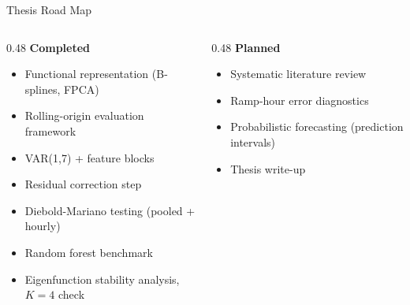 \documentclass[10pt,aspectratio=169]{beamer}
\begin{document}
\begin{frame}{Thesis Road Map}
  \begin{columns}
    \begin{column}{0.48\textwidth}
      \textbf{\textcolor{accentblue}{Completed}}
      \vspace{0.3em}
      \begin{itemize}
        \item[$\checkmark$] Functional representation (B-splines, FPCA)
        \item[$\checkmark$] Rolling-origin evaluation framework
        \item[$\checkmark$] VAR(1,7) + feature blocks
        \item[$\checkmark$] Residual correction step
        \item[$\checkmark$] Diebold-Mariano testing (pooled + hourly)
        \item[$\checkmark$] Random forest benchmark
        \item[$\checkmark$] Eigenfunction stability analysis, $K=4$ check
      \end{itemize}
    \end{column}
    \begin{column}{0.48\textwidth}
      \textbf{\textcolor{accentred}{Planned}}
      \vspace{0.3em}
      \begin{itemize}
        \item[$\square$] Systematic literature review
        \item[$\square$] Ramp-hour error diagnostics
        \item[$\square$] Probabilistic forecasting (prediction intervals)
        \item[$\square$] Thesis write-up
      \end{itemize}
    \end{column}
  \end{columns}
\end{frame}
\end{document}

